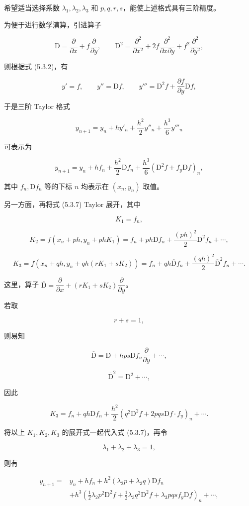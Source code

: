 \documentclass[
  10pt,
  fontset=fandol]{ctexart}
\begin{document}
希望适当选择系数 \(\lambda_1,\lambda_2,\lambda_3\) 和 \(p,q,r,s\)，能使上述格式具有三阶精度。

为便于进行数学演算，引进算子

\[
\mathrm D=\frac{\partial}{\partial x}+f\frac{\partial}{\partial y},\qquad
\mathrm D^2=\frac{\partial^2}{\partial x^2}+2f\frac{\partial^2}{\partial x\partial y}+f^2\frac{\partial^2}{\partial y^2},
\]

则根据式 (5.3.2)，有

\[
y'=f,\qquad y''=\mathrm Df,\qquad y'''=\mathrm D^2f+\frac{\partial f}{\partial y}\mathrm Df,
\]

于是三阶 Taylor 格式

\[
y_{n+1}=y_n+hy'_n+\frac{h^2}{2}y''_n+\frac{h^3}{6}y'''_n
\]

可表示为

\[
y_{n+1}=y_n+hf_n+\frac{h^2}{2}\mathrm Df_n+\frac{h^3}{6}(\mathrm D^2f+f_y\mathrm Df)_n,\tag{5.3.8}
\]

其中 \(f_n,\mathrm Df_n\) 等的下标 \(n\) 均表示在 \((x_n,y_n)\) 取值。

另一方面，再将式 (5.3.7) Taylor 展开，其中

\[
K_1=f_n,
\]

\[
K_2=f(x_n+ph,y_n+phK_1)=f_n+ph\mathrm Df_n+\frac{(ph)^2}{2}\mathrm D^2f_n+\cdots,
\]

\[
K_3=f(x_n+qh,y_n+qh(rK_1+sK_2))=f_n+qh\overline{\mathrm D}f_n+\frac{(qh)^2}{2}\overline{\mathrm D}^{2}f_n+\cdots.
\]

这里，算子 \(\overline{\mathrm D}=\dfrac{\partial}{\partial x}+(rK_1+sK_2)\dfrac{\partial}{\partial y}\)。

若取

\[
r+s=1,\tag{5.3.9}
\]

则易知

\[
\overline{\mathrm D}=\mathrm D+hps\mathrm Df_n\frac{\partial}{\partial y}+\cdots,\tag{5.3.10}
\]

\[
\overline{\mathrm D}^{2}=\mathrm D^2+\cdots,
\]

因此

\[
K_3=f_n+qh\mathrm Df_n+\frac{h^2}{2}(q^2\mathrm D^2f+2pqs\mathrm Df\cdot f_y)_n+\cdots.
\]

将以上 \(K_1,K_2,K_3\) 的展开式一起代入式 (5.3.7)，再令

\[
\lambda_1+\lambda_2+\lambda_3=1,\tag{5.3.11}
\]

则有

\[
\begin{aligned}
y_{n+1}={}&y_n+hf_n+h^2(\lambda_2p+\lambda_3q)\mathrm Df_n\\
&+h^3\left(\frac12\lambda_2p^2\mathrm D^2f+\frac12\lambda_3q^2\mathrm D^2f+\lambda_3pqsf_y\mathrm Df\right)_n+\cdots,
\end{aligned}
\]
\end{document}
